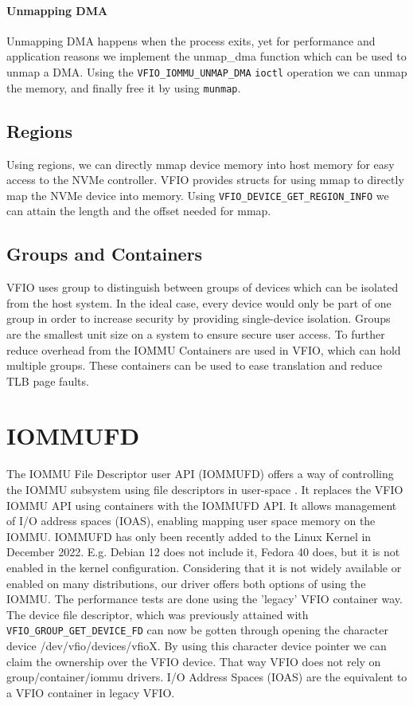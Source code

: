 \paragraph{Unmapping DMA}
Unmapping DMA happens when the process exits, yet for performance and application reasons we implement the unmap\_dma function which can be used to unmap a DMA. Using the \texttt{VFIO\_IOMMU\_UNMAP\_DMA} \texttt{ioctl} operation we can unmap the memory, and finally free it by using \texttt{munmap}.

\subsection{Regions}
Using regions, we can directly mmap device memory into host memory for easy access to the NVMe controller.
VFIO provides structs for using mmap to directly map the NVMe device into memory. Using \texttt{VFIO\_DEVICE\_GET\_REGION\_INFO} we can attain the length and the offset needed for mmap.

\subsection{Groups and Containers}
VFIO uses group to distinguish between groups of devices which can be isolated from the host system. In the ideal case, every device would only be part of one group in order to increase security by providing single-device isolation. Groups are the smallest unit size on a system to ensure secure user access.
To further reduce overhead from the IOMMU Containers are used in VFIO, which can hold multiple groups. These containers can be used to ease translation and reduce TLB page faults.

\section{IOMMUFD}
The IOMMU File Descriptor user API (IOMMUFD) offers a way of controlling the IOMMU subsystem using file descriptors in user-space \cite{iommufdkerneldocs}. It replaces the VFIO IOMMU API using containers with the IOMMUFD API.
It allows management of I/O address spaces (IOAS), enabling mapping user space memory on the IOMMU.
IOMMUFD has only been recently added to the Linux Kernel in December 2022. E.g. Debian 12 does not include it, Fedora 40 does, but it is not enabled in the kernel configuration. Considering that it is not widely available or enabled on many distributions, our driver offers both options of using the IOMMU. The performance tests are done using the 'legacy' VFIO container way.
The device file descriptor, which was previously attained with \texttt{VFIO\_GROUP\_GET\_DEVICE\_FD} can now be gotten through opening the character device /dev/vfio/devices/vfioX.
By using this character device pointer we can claim the ownership over the VFIO device. That way VFIO does not rely on group/container/iommu drivers.
I/O Address Spaces (IOAS) are the equivalent to a VFIO container in legacy VFIO.

